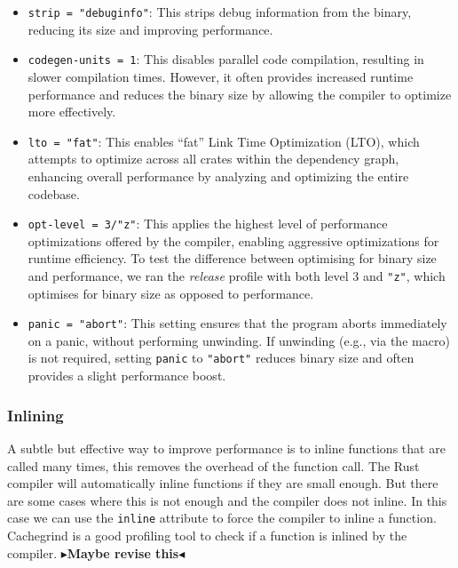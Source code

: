 \documentclass[11pt]{report}
\theoremstyle{definition}
\theoremstyle{plain}
\newcommand{\todo}[1]{{\color[rgb]{.5,0,0}\textbf{$\blacktriangleright$#1$\blacktriangleleft$}}}
\begin{document}
\begin{itemize}
  \item \texttt{strip = "debuginfo"}: This strips debug information from the binary, reducing its size and improving performance.

  \item \texttt{codegen-units = 1}: This disables parallel code compilation, resulting in slower compilation times. However, it often provides increased runtime performance and reduces the binary size by allowing the compiler to optimize more effectively.

  \item \texttt{lto = "fat"}: This enables ``fat'' Link Time Optimization (LTO), which attempts to optimize across all crates within the dependency graph, enhancing overall performance by analyzing and optimizing the entire codebase.

  \item \texttt{opt-level = 3/"z"}: This applies the highest level of performance optimizations offered by the compiler, enabling aggressive optimizations for runtime efficiency. To test the difference between optimising for binary size and performance, we ran the \textit{release} profile with both level 3 and \texttt{"z"}, which optimises for binary size as opposed to performance.


  \item \texttt{panic = "abort"}: This setting ensures that the program aborts immediately on a panic, without performing unwinding. If unwinding (e.g., via the  macro) is not required, setting \texttt{panic} to \texttt{"abort"} reduces binary size and often provides a slight performance boost.
\end{itemize}

\subsubsection{Inlining}
A subtle but effective way to improve performance is to inline functions that are called many times, this removes the overhead of the function call. The Rust compiler will automatically inline functions if they are small enough. But there are some cases where this is not enough and the compiler does not inline. In this case we can use the \texttt{inline} attribute to force the compiler to inline a function. Cachegrind is a good profiling tool to check if a function is inlined by the compiler.
\todo{Maybe revise this}
\end{document}
